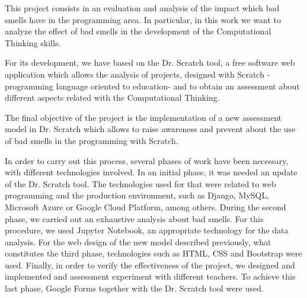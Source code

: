 This project consists in an evaluation and analysis of the impact which bad smells have in the programming area. In particular, in this work we want to analyze the effect of bad smells in the development of the Computational Thinking skills. 

For its development, we have based on the Dr. Scratch tool, a free software web application which allows the analysis of projects, designed with Scratch -programming language oriented to education- and to obtain an assessment about different aspects related with the Computational Thinking.

The final objective of the project is the implementation of a new assessment model in Dr. Scratch which allows to raise awareness and prevent about the use of bad smells in the programming with Scratch.

In order to carry out this process, several phases of work have been necessary, with different technologies involved. In an initial phase, it was needed an update of the Dr. Scratch tool. The technologies used for that were related to web programming and the production environment, such as Django, MySQL, Microsoft Azure or Google Cloud Platform, among others. During the second phase, we carried out an exhaustive analysis about bad smells. For this procedure, we used Jupyter Notebook, an appropriate technology for the data analysis. For the web design of the new model described previously, what constitutes the third phase, technologies such as HTML, CSS and Bootstrap were used. Finally, in order to verify the effectiveness of the project, we designed and implemented and assessment experiment with different teachers. To achieve this last phase, Google Forms together with the Dr. Scratch tool were used.
